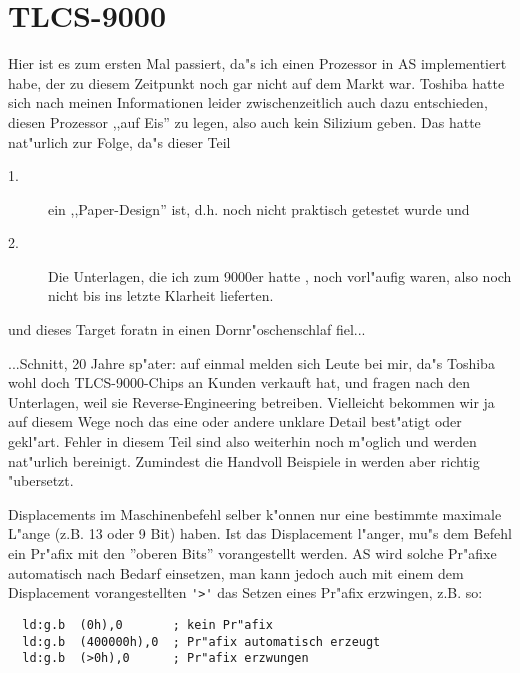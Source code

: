 \documentclass[12pt,a4paper,twoside]{report}
\begin{document}
{%

\section{TLCS-9000}

Hier ist es zum ersten Mal passiert, da"s ich einen Prozessor in AS
implementiert habe, der zu diesem Zeitpunkt noch gar nicht auf dem
Markt war.  Toshiba hatte sich nach meinen Informationen leider
zwischenzeitlich auch dazu entschieden, diesen Prozessor ,,auf Eis''
zu legen, also auch kein Silizium geben.  Das hatte nat"urlich zur Folge,
da"s dieser Teil
\begin{description}
\item[1.]{ein ,,Paper-Design'' ist, d.h. noch nicht praktisch getestet
          wurde und}
\item[2.]{Die Unterlagen, die ich zum 9000er hatte \cite{Tosh9000},
          noch vorl"aufig waren, also noch nicht bis ins letzte Klarheit
          lieferten.}
\end{description}
und dieses Target foratn in einen Dornr"oschenschlaf fiel...

...Schnitt, 20 Jahre sp"ater: auf einmal melden sich Leute bei
mir, da"s Toshiba wohl doch TLCS-9000-Chips an Kunden verkauft
hat, und fragen nach den Unterlagen, weil sie Reverse-Engineering
betreiben.  Vielleicht bekommen wir ja auf diesem Wege noch das
eine oder andere unklare Detail best"atigt oder gekl"art.  Fehler in
diesem Teil sind also weiterhin noch m"oglich und werden nat"urlich
bereinigt.  Zumindest die Handvoll Beispiele in \cite{Tosh9000} werden
aber richtig "ubersetzt.

Displacements im Maschinenbefehl selber k"onnen nur eine bestimmte
maximale L"ange (z.B. 13 oder 9 Bit) haben.  Ist das Displacement
l"anger, mu"s dem Befehl ein Pr"afix mit den ''oberen Bits''
vorangestellt werden.  AS wird solche Pr"afixe automatisch nach
Bedarf einsetzen, man kann jedoch auch mit einem dem Displacement
vorangestellten \verb!'>'! das Setzen eines Pr"afix erzwingen,
z.B. so:

\begin{verbatim}
  ld:g.b  (0h),0       ; kein Pr"afix
  ld:g.b  (400000h),0  ; Pr"afix automatisch erzeugt
  ld:g.b  (>0h),0      ; Pr"afix erzwungen
\end{verbatim}


}
\end{document}
